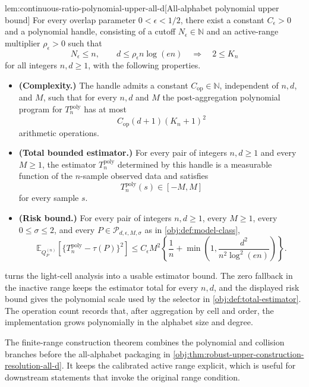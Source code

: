 \begin{lemmav}{lem:continuous-ratio-polynomial-upper-all-d}[All-alphabet polynomial upper bound]
For every overlap parameter \(0<\epsilon<1/2\), there exist a constant \(C_{\epsilon}>0\) and a polynomial handle, consisting of a cutoff \(N_{\epsilon}\in\mathbb N\) and an active-range multiplier \(\rho_{\epsilon}>0\) such that
\[
N_{\epsilon}\le n,\qquad d\le \rho_{\epsilon}n\log(en)
\quad\Longrightarrow\quad
2\le K_n
\]
for all integers \(n,d\ge1\), with the following properties.
\begin{itemize}
\item \textbf{(Complexity.)} The handle admits a constant \(C_{\mathrm{op}}\in\mathbb N\), independent of \(n,d\), and \(M\), such that for every \(n,d\) and \(M\) the post-aggregation polynomial program for \(T_n^{\mathrm{poly}}\) has at most
\[
C_{\mathrm{op}}(d+1)(K_n+1)^2
\]
arithmetic operations.
\item \textbf{(Total bounded estimator.)} For every pair of integers \(n,d\ge1\) and every \(M\ge1\), the estimator \(T_n^{\mathrm{poly}}\) determined by this handle is a measurable function of the \(n\)-sample observed data and satisfies
\[
T_n^{\mathrm{poly}}(s)\in[-M,M]
\]
for every sample \(s\).
\item \textbf{(Risk bound.)} For every pair of integers \(n,d\ge1\), every \(M\ge1\), every \(0\le\sigma\le2\), and every \(P\in\mathcal P_{d,\epsilon,M,\sigma}\) as in \cref{obj:def:model-class},
\[
\mathbb E_{Q_P^{(n)}}\!\left[\{T_n^{\mathrm{poly}}-\tau(P)\}^2\right]
\le
C_{\epsilon}M^2
\left\{
\frac{1}{n}
+
\min\!\left(1,\frac{d^2}{n^2\log^2(en)}\right)
\right\}.
\]
\end{itemize}
\end{lemmav}

 turns the light-cell analysis into a usable estimator bound. The zero fallback in the inactive range keeps the estimator total for every \(n,d\), and the displayed risk bound gives the polynomial scale used by the selector in \cref{obj:def:total-estimator}. The operation count records that, after aggregation by cell and order, the implementation grows polynomially in the alphabet size and degree.

The finite-range construction theorem combines the polynomial and collision branches before the all-alphabet packaging in \cref{obj:thm:robust-upper-construction-resolution-all-d}. It keeps the calibrated active range explicit, which is useful for downstream statements that invoke the original range condition.

